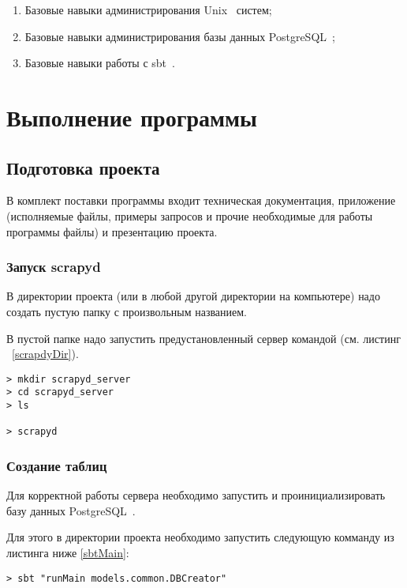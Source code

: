 \documentclass[a4paper,12pt]{article}
\begin{document}
    \begin{enumerate}
        \item Базовые навыки администрирования Unix~\cite{unix} систем;
        \item Базовые навыки администрирования базы данных PostgreSQL~\cite{postgresql};
        \item Базовые навыки работы с sbt~\cite{sbt}.
    \end{enumerate}
					\newpage 
	\section{Выполнение программы}
	
	\subsection{Подготовка проекта}
	В комплект поставки программы входит техническая документация, приложение (исполняемые файлы, примеры запросов и прочие необходимые для работы программы файлы) и презентацию проекта.
	\subsubsection{Запуск scrapyd}
	
	В директории проекта (или в любой другой директории на компьютере) надо создать пустую папку с произвольным названием.
	
	В пустой папке надо запустить предустановленный сервер командой  (см. листинг ~\ref{scrapdyDir}). 
	
	\begin{lstlisting}[frame=single, basicstyle=\footnotesize\ttfamily,caption=Запуск scrapyd,captionpos=b,label=scrapdyDir]
> mkdir scrapyd_server
> cd scrapyd_server
> ls

> scrapyd
\end{lstlisting}
	
	\subsubsection{Создание таблиц}
	
	Для корректной работы сервера необходимо запустить и проинициализировать базу данных PostgreSQL~\cite{postgresql}.
	
	Для этого в директории проекта необходимо запустить следующую комманду из листинга ниже \ref{sbtMain}:
	
	\begin{lstlisting}[frame=single,basicstyle=\footnotesize\ttfamily,caption=Создание и инициализация таблиц,captionpos=b,label=sbtMain]
> sbt "runMain models.common.DBCreator"
\end{lstlisting}
	
\end{document}
